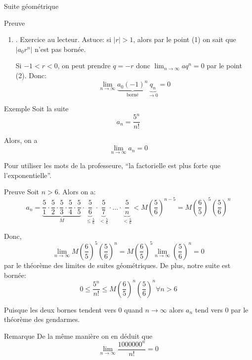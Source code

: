 \documentclass[a4paper]{article}
\begin{document}
\begin{parag}{Suite géométrique}
\begin{subparag}{Preuve}
\begin{enumerate}[left=0pt]
            
        \item {}. Exercice au lecteur. Astuce: si $\left|r\right| > 1$, alors par le point (1) on sait que $\left|a_0 r^{n}\right|$ n'est pas bornée. 

                Si $-1 < r < 0$, on peut prendre $q = -r$ donc $\lim_{n \to \infty} a q^{n} = 0$ par le point (2). Donc: 
                \[\lim_{n \to \infty} \underbrace{a_0 \left(-1\right)^{n}}_{\text{borné}} \underbrace{q_n}_{\to 0} = 0\]
        \end{enumerate}
    \end{subparag}
\end{parag}

\begin{parag}{Exemple}
    Soit la suite 
    \[a_n = \frac{5^{n}}{n!}\]

    Alors, on a 
    \[\lim_{n \to \infty} a_n = 0\]
    
    Pour utiliser les mots de la professeure, ``la factorielle est plus forte que l'exponentielle''.

    \begin{subparag}{Preuve}
        Soit $n > 6$. Alors on a: 
        \[a_n = \underbrace{\frac{5}{1} \cdot \frac{5}{2} \cdot \frac{5}{3} \cdot \frac{5}{4} \cdot \frac{5}{5}}_{M} \cdot \underbrace{\frac{5}{6}}_{\leq \frac{5}{6}} \cdot \underbrace{\frac{5}{7}}_{< \frac{5}{6}} \cdot \ldots \cdot \underbrace{\frac{5}{n}}_{< \frac{5}{6}} < M\left(\frac{5}{6}\right)^{n-5} = M\left(\frac{6}{5}\right)^{5} \left(\frac{5}{6}\right)^{n}\]
        
        Donc, 
        \[\lim_{n \to \infty} M\left(\frac{6}{5}\right)^5 \left(\frac{5}{6}\right)^n =  M\left(\frac{6}{5}\right)^5\lim_{n \to \infty} \left(\frac{5}{6}\right)^n = 0\]
        par le théorème des limites de suites géométriques. De plus, notre suite est bornée: 
        \[0 \leq \frac{5^{n}}{n!} \leq M\left(\frac{6}{5}\right)^{n} \left(\frac{5}{6}\right)^{n} \forall n > 6\]
        
        Puisque les deux bornes tendent vers 0 quand $n \to \infty$ alors $a_n$ tend vers 0 par le théorème des gendarmes. 
    \end{subparag}
    
    \begin{subparag}{Remarque}
        De la même manière on en déduit que 
        \[\lim_{n \to \infty} \frac{1000000^n}{n!} = 0\]
    \end{subparag}
\end{parag}
\end{document}
